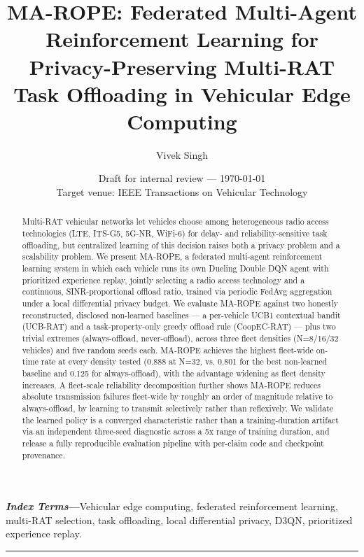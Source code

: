 \documentclass[journal,10pt,twocolumn]{IEEEtran}
\title{\textbf{MA-ROPE: Federated Multi-Agent Reinforcement Learning for Privacy-Preserving Multi-RAT Task Offloading in Vehicular Edge Computing}}
\author{Vivek Singh}
\date{Draft for internal review --- \today\\ \small{Target venue: IEEE Transactions on Vehicular Technology}}
\begin{document}
\maketitle
\thispagestyle{empty}

\begin{abstract}
Multi-RAT vehicular networks let vehicles choose among heterogeneous radio access technologies
(LTE, ITS-G5, 5G-NR, WiFi-6) for delay- and reliability-sensitive task offloading, but centralized
learning of this decision raises both a privacy problem and a scalability problem. We present
MA-ROPE, a federated multi-agent reinforcement learning system in which each vehicle runs its own
Dueling Double DQN agent with prioritized experience replay, jointly selecting a radio access
technology and a continuous, SINR-proportional offload ratio, trained via periodic FedAvg
aggregation under a local differential privacy budget. We evaluate MA-ROPE against two honestly
reconstructed, disclosed non-learned baselines --- a per-vehicle UCB1 contextual bandit
(UCB-RAT) and a task-property-only greedy offload rule (CoopEC-RAT) --- plus two trivial extremes
(always-offload, never-offload), across three fleet densities (N=8/16/32 vehicles) and five random
seeds each. MA-ROPE achieves the highest fleet-wide on-time rate at every density tested (0.888 at
N=32, vs. 0.801 for the best non-learned baseline and 0.125 for always-offload), with the advantage
widening as fleet density increases. A fleet-scale reliability decomposition further shows MA-ROPE
reduces absolute transmission failures fleet-wide by roughly an order of magnitude relative to
always-offload, by learning to transmit selectively rather than reflexively. We validate the
learned policy is a converged characteristic rather than a training-duration artifact via an
independent three-seed diagnostic across a 5x range of training duration, and release a fully
reproducible evaluation pipeline with per-claim code and checkpoint provenance.
\end{abstract}

\vspace{0.3em}
\noindent\textbf{\textit{Index Terms}---}Vehicular edge computing, federated reinforcement learning, multi-RAT selection, task offloading, local differential privacy, D3QN, prioritized experience replay.
\vspace{0.8em}
\hrule
\vspace{1em}
\end{document}
